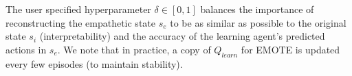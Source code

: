 The user specified hyperparameter $\delta \in [0,1]$ balances the importance of reconstructing the empathetic state $s_{e}$ to be as similar as possible to the original state $s_{i}$ (interpretability) and the accuracy of the learning agent's predicted actions in $s_e$. We note that in practice, a copy of $Q_{learn}$ for EMOTE is updated every few episodes (to maintain stability). %





